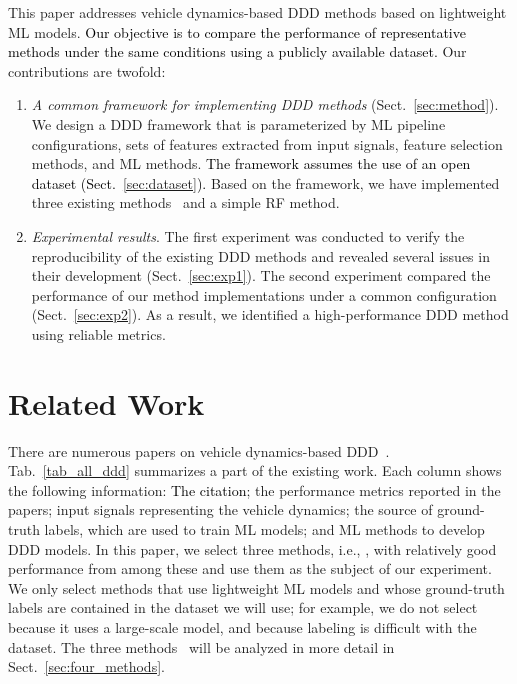 \documentclass[letterpaper, 10 pt, conference]{ieeeconf}  %
\newcommand{\Ishii}[1]{\textcolor{black}{#1}}
\begin{document}
This paper addresses vehicle dynamics-based DDD methods based on lightweight ML models.
\Ishii{Our objective is to compare the performance of representative methods under the same conditions using a publicly available dataset.}
Our contributions are twofold:
\begin{enumerate}
\item \emph{A common framework for implementing DDD methods} (Sect.~\ref{sec:method}).
    We design a DDD framework that is parameterized by
    ML pipeline configurations,
    sets of features extracted from input signals, 
    feature selection methods, and
    ML methods.
    \Ishii{The framework assumes the use of an open dataset (Sect.~\ref{sec:dataset}).}
    Based on the framework, we have implemented three existing methods~\cite{Arefnezhad2019,Zhao2009,Wang2022} and a simple RF method.
\item \emph{Experimental results}.
    The first experiment was conducted to verify the reproducibility of the existing DDD methods and revealed several issues in their development (Sect.~\ref{sec:exp1}).
    The second experiment compared the performance of our method implementations under a common configuration (Sect.~\ref{sec:exp2}).
    As a result, we identified a high-performance DDD method using reliable metrics.
\end{enumerate}

%

\section{Related Work}
\label{sec:related_work}

There are numerous papers on vehicle dynamics-based DDD~\cite{Albadawi2022,Perkins2023}.
Tab.~\ref{tab_all_ddd} summarizes a part of the existing work.
Each column shows the following information:
\Ishii{The citation};
the performance metrics reported in the papers;
input signals representing the vehicle dynamics;
the source of ground-truth labels, which are used to train ML models; and
ML methods to develop DDD models.
%
In this paper, we select three methods, i.e., \cite{Arefnezhad2019,Zhao2009,Wang2022}, with relatively good performance from among these and use them as the subject of our experiment.
We only select methods that use lightweight ML models and whose ground-truth labels are contained in the dataset we will use;
for example, we do not select \cite{Arefnezhad2020} because it uses a large-scale model, and \cite{Xue2023} because labeling is difficult with the dataset.
%
The three methods~\cite{Arefnezhad2019,Zhao2009,Wang2022} will be analyzed in more detail in Sect.~\ref{sec:four_methods}.
\end{document}
